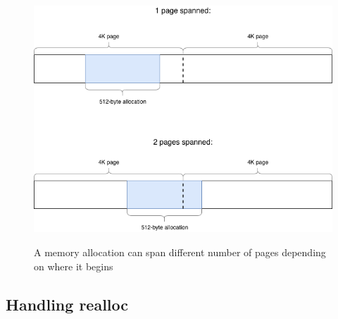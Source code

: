\begin{figure}
	\centering
	\includegraphics[width=\textwidth]{diagrams/allocation_spanned_pages.png}
	\label{fig:allocation-spanned-pages}
	\caption{A memory allocation can span different number of pages depending on where it begins}
\end{figure}

\subsection{Handling realloc}

%
%

